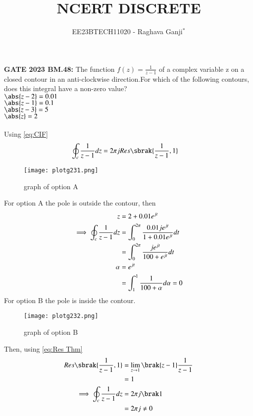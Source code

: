 \documentclass[journal,12pt,twocolumn]{IEEEtran}
\theoremstyle{remark}
\begin{document}

\vspace{3cm}

\title{NCERT DISCRETE}
\author{EE23BTECH11020 - Raghava Ganji$^{*}$%
}
\maketitle
\newpage
\bigskip

\renewcommand{\thefigure}{\theenumi}
\renewcommand{\thetable}{\theenumi}

\textbf{GATE 2023 BM.48:}
The function $f(z)=\frac{1}{z-1}$ of a complex variable z on a closed contour in an anti-clockwise direction.For which of the following contours, does this integral have a non-zero value?\\
$\abs{z-2}=0.01$\\
$\abs{z-1}=0.1$\\
$\abs{z-3}=5$\\
$\abs{z}=2$\\
\solution\\
Using \eqref{eq:CIF}
\begin{align}
\oint_{c}\frac{1}{z-1}dz &=2\pi jRes\sbrak{\frac{1}{z-1},1}
\end{align}
\begin{figure}[h!]
    \centering
    \texttt{[image: plotg231.png]}
    \caption{graph of option A}
\end{figure}
For option A the pole is outside the contour, then\\
\begin{align}
\notag z&=2+0.01e^{jt}\\
\implies \oint_{c}\frac{1}{z-1}dz&=\int_{0}^{2\pi}\frac{0.01je^{jt}}{1+0.01e^{jt}}dt\\
&=\int_{0}^{2\pi}\frac{je^{jt}}{100+e^{jt}}dt\\
\notag \alpha&=e^{jt}\\
&=\int_{1}^{1}\frac{1}{100+\alpha}d\alpha=0
\end{align}
For option B the pole is inside the contour.\\
\begin{figure}[h!]
    \centering
    \texttt{[image: plotg232.png]}
    \caption{graph of option B}
\end{figure}
Then, using \eqref{eq:Res Thm}
\begin{align}
Res\sbrak{\frac{1}{z-1},1} &=\lim_{z\to 1}\brak{z-1}\frac{1}{z-1}\\
\notag &=1\\
\implies \oint_{c}\frac{1}{z-1}dz&=2\pi j\brak 1\\
\notag &=2\pi j\neq 0
\end{align}
\end{document}
